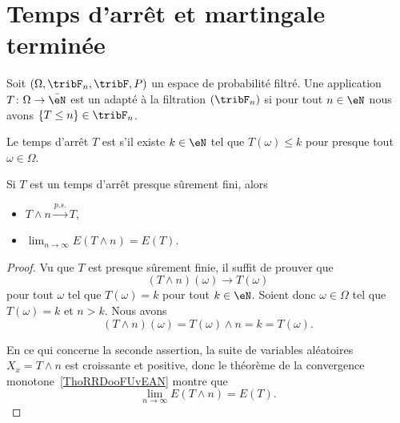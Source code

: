 \section{Temps d'arrêt et martingale terminée}

\begin{definition}
    Soit \( (\Omega,\tribF_n,\tribF,P)\) un espace de probabilité filtré. Une application \( T\colon \Omega\to \bar \eN\) est un  adapté à la filtration \( (\tribF_n)\) si pour tout \( n\in \eN\) nous avons \( \{ T\leq n \}\in\tribF_n\).

    Le temps d'arrêt $T$ est  s'il existe \( k\in \eN\) tel que \( T(\omega)\leq k\) pour presque tout \( \omega\in \Omega\).
\end{definition}

\begin{lemma} \label{LemXYeCLXW}
    Si \( T\) est un temps d'arrêt presque sûrement fini, alors
    \begin{itemize}
        \item \( T\wedge n\stackrel{p.s.}{\longrightarrow}T\),
        \item   \label{ItemIPPkxmAii}
            \( \lim_{n\to \infty}  E(T\wedge n)=E(T)\).
    \end{itemize}
\end{lemma}

\begin{proof}
    Vu que \( T \) est presque sûrement finie, il suffit de prouver que
    \begin{equation}    \label{EqRVoKxsN}
        (T\wedge n)(\omega)\to T(\omega)
    \end{equation}
    pour tout \( \omega\) tel que \( T(\omega)=k\) pour tout \( k\in \eN\). Soient donc \( \omega\in \Omega\) tel que \( T(\omega)=k\) et \( n>k\). Nous avons
    \begin{equation}
        (T\wedge n)(\omega)=T(\omega)\wedge n=k=T(\omega).
    \end{equation}

    En ce qui concerne la seconde assertion, la suite de variables aléatoires \( X_x=T\wedge n\) est croissante et positive, donc le théorème de la convergence monotone~\ref{ThoRRDooFUvEAN} montre que
    \begin{equation}
        \lim_{n\to \infty}E(T\wedge n)=E(T).
    \end{equation}
\end{proof}

